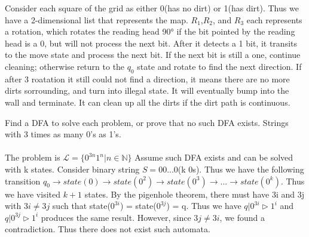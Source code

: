 \documentclass{article}
\begin{document}
\begin{addmargin}[2em]{2em}
	Consider each square of the grid as either 0(has no dirt) or 1(has dirt). Thus we have a 2-dimensional list that represents the map. $R_1$,$R_2$, and $R_3$ each represents a rotation, which rotates the reading head 90° if the bit pointed by the reading head is a 0, but will not process the next bit. After it detects a 1 bit, it transits to the move state and process the next bit. If the next bit is still a one, continue cleaning; otherwise return to the $q_0$ state and rotate to find the next direction. If after 3 roatation it still could not find a direction, it means there are no more dirts sorrounding, and turn into illegal state. It will eventually bump into the wall and terminate. It can clean up all the dirts if the dirt path is continuous.
\end{addmargin}
\clearpage
\begin{addmargin}[2em]{2em}
	 Find a DFA to solve each problem, or prove that no such DFA exists. Strings with 3 times as many 0’s as 1’s.\\\\
	The problem is $\mathcal{L} = \{0^{3n}1^n|n \in \mathbb{N}\}$
	Assume such DFA exists and can be solved with k states. Consider binary string $S = 00...0$(k 0s). Thus we have the following transition $q_0 \rightarrow state(0) \rightarrow state(0^2) \rightarrow state(0^3) \rightarrow ... \rightarrow state(0^k)$. Thus we have visited $k+1$ states. By the pigenhole theorem, there must have 3i and 3j with $3i \neq 3j$ such that state($0^{3i}$) = state($0^{3j}$) = q. Thus we have $q|0^{3i} \triangleright 1^i$ and $q|0^{3j} \triangleright 1^i$ produces the same result. However, since $3j \neq 3i$, we found a contradiction. Thus there does not exist such automata.
\end{addmargin}
\end{document}
